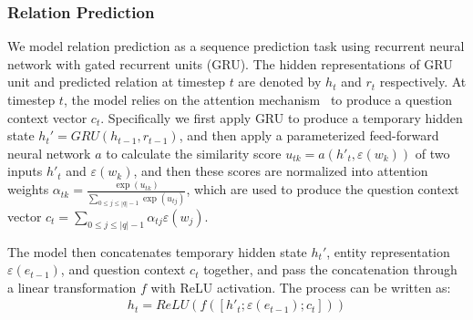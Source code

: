 \subsubsection{Relation Prediction} 
We model relation prediction as a sequence prediction task using recurrent neural network with gated recurrent units (GRU). The hidden representations of GRU unit and predicted relation at timestep $t$ are denoted by $h_t$ and $r_t$ respectively. At timestep $t$, the model relies on the attention mechanism~\cite{DBLP:journals/corr/BahdanauCB14} to produce a question context vector $c_t$. Specifically we first apply GRU to produce a temporary hidden state  $h_{t}'=GRU(h_{t-1}, r_{t-1})$, and then apply a parameterized feed-forward neural network $a$ to calculate the similarity score $u_{tk} = a(h'_{t},\varepsilon(w_k))$ of two inputs $h'_{t}$ and $\varepsilon(w_k)$,  and then these scores are normalized into attention weights $\alpha_{tk}=\frac{\exp (u_{tk})}{\sum_{0\leq j\leq |q|-1}\exp (u_{tj})}$, which are used to produce the question context vector $c_t=\sum_{0\leq j\leq |q|-1}\alpha_{tj}\varepsilon(w_j)$. 


The model then concatenates temporary hidden state $h_{t}'$, entity representation $\varepsilon(e_{t-1})$, and question context $c_t$ together, and pass the concatenation through a linear transformation $f$ with ReLU activation. The process can be  written as:
\begin{align}
h_t = ReLU(f([h'_{t}; \varepsilon(e_{t-1}); c_t]))
\end{align}


